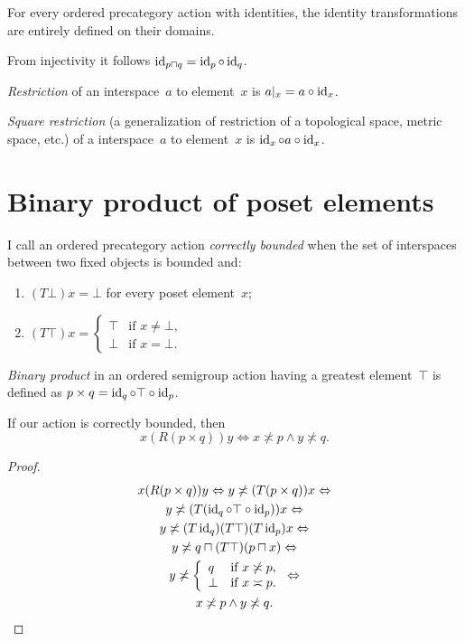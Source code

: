 \begin{obvious}
For every ordered precategory action with identities, the identity transformations are entirely defined on their domains.
\end{obvious}

From injectivity it follows $\operatorname{id}_{p\sqcap q} = \operatorname{id}_p\circ\operatorname{id}_q$.

\emph{Restriction} of an interspace~$a$ to element~$x$ is $a|_x=a\circ\operatorname{id}_x$.

\emph{Square restriction} (a generalization of restriction of a topological space, metric space, etc.) of a interspace~$a$ to element~$x$ is $\operatorname{id}_x\circ a\circ\operatorname{id}_x$.

\chapter{Binary product of poset elements}

\begin{defn}
I call an ordered precategory action \emph{correctly bounded} when the set of interspaces between two fixed objects is bounded and:
\begin{enumerate}
\item $(T\bot)x = \bot$ for every poset element~$x$;
\item $(T\top)x =
\left\{\begin{array}{ll}\top&\text{if }x\ne\bot,\\\bot&\text{if }x=\bot.\end{array}\right.$
\end{enumerate}
\end{defn}

\emph{Binary product} in an ordered semigroup action having a greatest element~$\top$ is defined as $p\times q=\operatorname{id}_q\circ\top\circ\operatorname{id}_p$.

\begin{thm}
If our action is correctly bounded, then
\[ x(R(p\times q))y\Leftrightarrow x\nasymp p\land y\nasymp q. \]
\end{thm}

\begin{proof}
\begin{multline*}
x(R(p\times q))y \Leftrightarrow
y\not\asymp(T(p\times q))x \Leftrightarrow \\
y\not\asymp(T(\operatorname{id}_q\circ\top\circ\operatorname{id}_p))x \Leftrightarrow \\
y\not\asymp (T\operatorname{id}_q)(T\top)(T\operatorname{id}_p)x \Leftrightarrow \\
y\not\asymp q\sqcap(T\top)(p\sqcap x) \Leftrightarrow \\
y\not\asymp
\left\{\begin{array}{ll}q&\text{if }x\not\asymp p,\\\bot&\text{if }x\asymp p.\end{array}\right. \Leftrightarrow \\
x\not\asymp p\land y\not\asymp q.
\end{multline*}
\end{proof}

